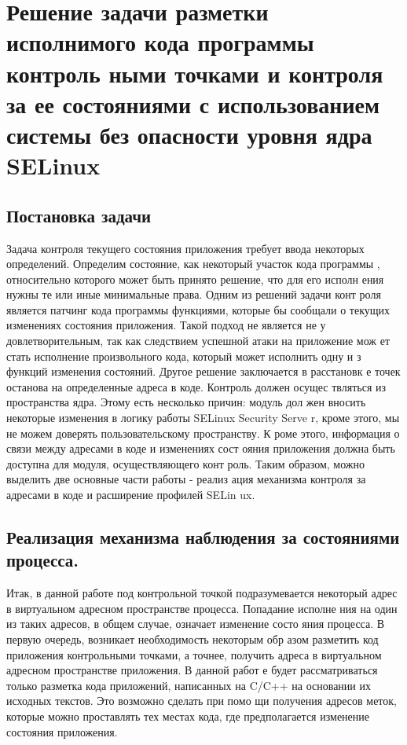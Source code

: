 
\section{Решение задачи разметки исполнимого кода программы контроль
ными точками и контроля за ее состояниями с использованием системы без
опасности уровня ядра SELinux}

\subsection{Постановка задачи} 

Задача контроля текущего состояния приложения требует ввода некоторых 
определений. Определим состояние, как некоторый участок кода программы
, относительно которого может быть принято решение, что для его исполн
ения нужны те или иные минимальные права. Одним из решений задачи конт
роля является патчинг кода программы функциями, которые бы сообщали о 
текущих изменениях состояния приложения. Такой подход не является не у
довлетворительным, так как следствием успешной атаки на приложение мож
ет стать исполнение произвольного кода, который может исполнить одну и
з функций изменения состояний. Другое решение заключается в расстановк
е точек останова на определенные адреса в коде. Контроль должен осущес
твляться из пространства ядра. Этому есть несколько причин: модуль дол
жен вносить некоторые изменения в логику работы SELinux Security Serve
r, кроме этого, мы не можем доверять пользовательскому пространству. К
роме этого, информация о связи между адресами в коде и изменениях сост
ояния приложения должна быть доступна для модуля, осуществляющего конт
роль. Таким образом, можно выделить две основные части работы - реализ
ация механизма контроля за адресами в коде и расширение профилей SELin
ux.

\bigskip 
\subsection{Реализация механизма наблюдения за состояниями процесса.}

Итак, в данной работе под контрольной точкой подразумевается некоторый
 адрес в виртуальном адресном пространстве процесса. Попадание исполне
ния на один из таких адресов, в общем случае, означает изменение состо
яния процесса. В первую очередь, возникает необходимость некоторым обр
азом разметить код приложения контрольными точками, а точнее, получить
 адреса в виртуальном адресном пространстве приложения. В данной работ
е будет рассматриваться только разметка кода приложений, написанных на
 C/C++ на основании их исходных текстов. Это возможно сделать при помо
щи получения адресов меток, которые можно проставлять тех местах кода,
 где предполагается изменение состояния приложения. 

